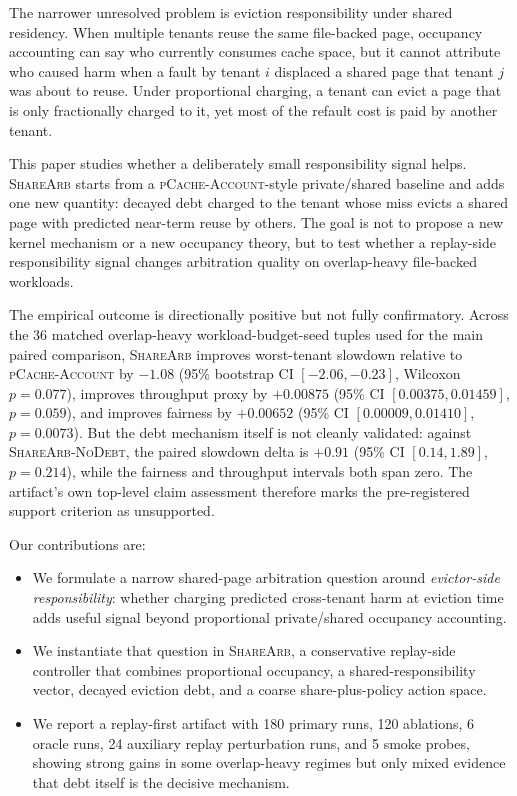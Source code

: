 \documentclass{article}
\newcommand{\sharearb}{\textsc{ShareArb}\xspace}
\newcommand{\pcache}{\textsc{pCache-Account}\xspace}
\begin{document}
The narrower unresolved problem is eviction responsibility under shared residency. When multiple tenants reuse the same file-backed page, occupancy accounting can say who currently consumes cache space, but it cannot attribute who caused harm when a fault by tenant $i$ displaced a shared page that tenant $j$ was about to reuse. Under proportional charging, a tenant can evict a page that is only fractionally charged to it, yet most of the refault cost is paid by another tenant.

This paper studies whether a deliberately small responsibility signal helps. \sharearb starts from a \pcache-style private/shared baseline and adds one new quantity: decayed debt charged to the tenant whose miss evicts a shared page with predicted near-term reuse by others. The goal is not to propose a new kernel mechanism or a new occupancy theory, but to test whether a replay-side responsibility signal changes arbitration quality on overlap-heavy file-backed workloads.

The empirical outcome is directionally positive but not fully confirmatory. Across the 36 matched overlap-heavy workload-budget-seed tuples used for the main paired comparison, \sharearb improves worst-tenant slowdown relative to \pcache by $-1.08$ (95\% bootstrap CI $[-2.06,-0.23]$, Wilcoxon $p=0.077$), improves throughput proxy by $+0.00875$ (95\% CI $[0.00375,0.01459]$, $p=0.059$), and improves fairness by $+0.00652$ (95\% CI $[0.00009,0.01410]$, $p=0.0073$). But the debt mechanism itself is not cleanly validated: against \textsc{ShareArb-NoDebt}, the paired slowdown delta is $+0.91$ (95\% CI $[0.14,1.89]$, $p=0.214$), while the fairness and throughput intervals both span zero. The artifact's own top-level claim assessment therefore marks the pre-registered support criterion as unsupported.

Our contributions are:
\begin{itemize}[leftmargin=1.5em]
  \item We formulate a narrow shared-page arbitration question around \emph{evictor-side responsibility}: whether charging predicted cross-tenant harm at eviction time adds useful signal beyond proportional private/shared occupancy accounting.
  \item We instantiate that question in \sharearb, a conservative replay-side controller that combines proportional occupancy, a shared-responsibility vector, decayed eviction debt, and a coarse share-plus-policy action space.
  \item We report a replay-first artifact with 180 primary runs, 120 ablations, 6 oracle runs, 24 auxiliary replay perturbation runs, and 5 smoke probes, showing strong gains in some overlap-heavy regimes but only mixed evidence that debt itself is the decisive mechanism.
\end{itemize}
\end{document}
